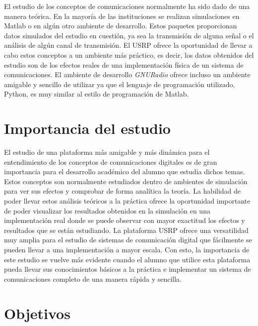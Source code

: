 El estudio de los conceptos de comunicaciones normalmente ha sido dado de una
manera te\'orica. En la mayor\'ia de las instituciones se realizan simulaciones
en Matlab o en alg\'un otro ambiente de desarrollo. Estos paquetes proporcionan
datos simulados del estudio en cuesti\'on, ya sea la transmisi\'on de alguna
se\~nal o el an\'alisis de alg\'un canal de transmisi\'on. El USRP ofrece la
oportunidad de llevar a cabo estos conceptos a un ambiente m\'as pr\'actico, es
decir, los datos obtenidos del estudio son de los efectos reales de una
implementaci\'on f\'isica de un sistema de comunicaciones. El ambiente de
desarrollo \emph{GNURadio} ofrece incluso un ambiente amigable y sencillo de
utilizar ya que el lenguaje de programaci\'on utilizado, Python, es muy similar
al estilo de programaci\'on de Matlab.

\section{Importancia del estudio}

El estudio de una plataforma m\'as amigable y m\'as din\'amica para el
entendimiento de los conceptos de comunicaciones digitales es de gran importancia para el 
desarrollo acad\'emico del alumno que estudia dichos temas. Estos conceptos son 
normalmente estudiados dentro de ambientes de simulaci\'on para ver sus efectos 
y comprobar de forma anal\'itica la teor\'ia. La habilidad de poder llevar estos 
an\'alisis te\'oricos a la pr\'actica ofrece la oportunidad importante de poder 
visualizar los resultados obtenidos en la simulaci\'on en una implementaci\'on 
real donde se puede observar con mayor exactitud los efectos y resultados 
que se est\'an estudiando. La plataforma USRP ofrece una versatilidad muy 
amplia para el estudio de sistemas de comunicaci\'on digital que f\'acilmente 
se pueden llevar a una implementaci\'on a mayor escala. Con esto, la importancia 
de este estudio se vuelve m\'as evidente cuando el alumno que utilice esta 
plataforma pueda llevar sus conocimientos b\'asicos a la pr\'actica e
implementar un sistema de comunicaciones completo de una manera r\'apida y
sencilla.

\section{Objetivos}

